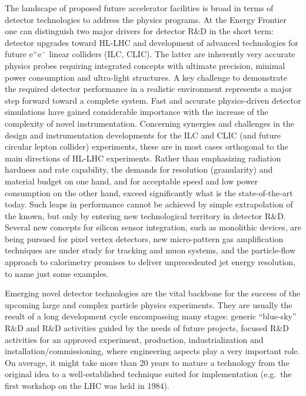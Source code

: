 \documentclass[10pt,final]{report}
\begin{document}
The landscape of proposed future accelerator facilities is broad in terms of detector
technologies to address the physics programs. At the Energy Frontier one can distinguish
two major drivers for detector R\&D in the short term: detector upgrades toward HL-LHC
and development of advanced technologies for future $\mathrm{e}^{+}\mathrm{e}^{-}$
linear colliders (ILC, CLIC). The latter are inherently very accurate physics probes requiring
integrated concepts with ultimate precision, minimal power consumption and ultra-light
structures. A key challenge to demonstrate the required detector performance in a realistic
environment represents a major step forward toward a complete system. Fast and accurate
physics-driven detector simulations have gained considerable importance with the increase of
the complexity of novel instrumentation. Concerning synergies and challenges in the design
and instrumentation developments for the ILC and CLIC (and future circular lepton collider)
experiments, these are in most cases orthogonal to the main directions of HL-LHC
experiments. Rather than emphasizing radiation hardness and rate capability, the demands
for resolution (granularity) and material budget on one hand, and for acceptable speed and
low power consumption on the other hand, exceed significantly what is the state-of-the-art today.
Such leaps in performance cannot be achieved by simple extrapolation of the known, but
only by entering new technological territory in detector R\&D. Several new concepts for silicon
sensor integration, such as monolithic devices, are being pursued for pixel vertex detectors,
new micro-pattern gas amplification techniques are under study for tracking and muon systems,
and the particle-flow approach to calorimetry promises to deliver unprecedented jet energy
resolution, to name just some examples.

Emerging novel detector technologies are the vital backbone for the success of the
upcoming large and complex particle physics experiments. They are usually the result of a
long development cycle encompassing many stages: generic ``blue-sky'' R\&D and R\&D
activities guided by the needs of future projects, focused R\&D activities for an approved
experiment, production, industrialization and installation/commissioning, where engineering
aspects play a very important role. On average, it might take more than 20 years to mature a
technology from the original idea to a well-established technique suited for implementation
(e.g.\ the first workshop on the LHC was held in 1984).
\end{document}
